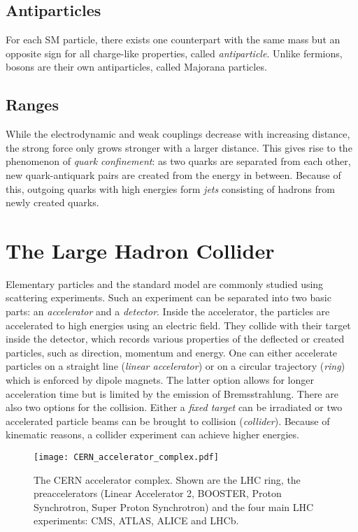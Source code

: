 \subsection{Antiparticles}
For each SM particle, there exists one counterpart with the same mass but an opposite sign for all charge-like properties, called \emph{antiparticle}. Unlike fermions, bosons are their own antiparticles, called Majorana particles.

\subsection{Ranges}
While the electrodynamic and weak couplings decrease with increasing distance, the strong force only grows stronger with a larger distance. This gives rise to the phenomenon of \emph{quark confinement}: as two quarks are separated from each other, new quark-antiquark pairs are created from the energy in between. Because of this, outgoing quarks with high energies form \emph{jets} consisting of hadrons from newly created quarks.

\section{The Large Hadron Collider}
Elementary particles and the standard model are commonly studied using scattering experiments. Such an experiment can be separated into two basic parts: an \emph{accelerator} and a \emph{detector}.
Inside the accelerator, the particles are accelerated to high energies using an electric field. They collide with their target inside the detector, which records various properties of the deflected or created particles, such as direction, momentum and energy. 
One can either accelerate particles on a straight line (\emph{linear accelerator}) or on a circular trajectory (\emph{ring}) which is enforced by dipole magnets. The latter option allows for longer acceleration time but is limited by the emission of Bremsstrahlung.
There are also two options for the collision. Either a \emph{fixed target} can be irradiated or two accelerated particle beams can be brought to collision (\emph{collider}). Because of kinematic reasons, a collider experiment can achieve higher energies.

\begin{figure}[htb]
	\centering
	\texttt{[image: CERN\_accelerator\_complex.pdf]}
	\caption{The CERN accelerator complex\cite[modified]{Marcastel2013CERNs}. Shown are the LHC ring, the preaccelerators (Linear Accelerator 2, BOOSTER, Proton Synchrotron, Super Proton Synchrotron) and the four main LHC experiments: CMS, ATLAS, ALICE and LHCb.}
	\label{fig:cern_accelerator_complex}
\end{figure}

